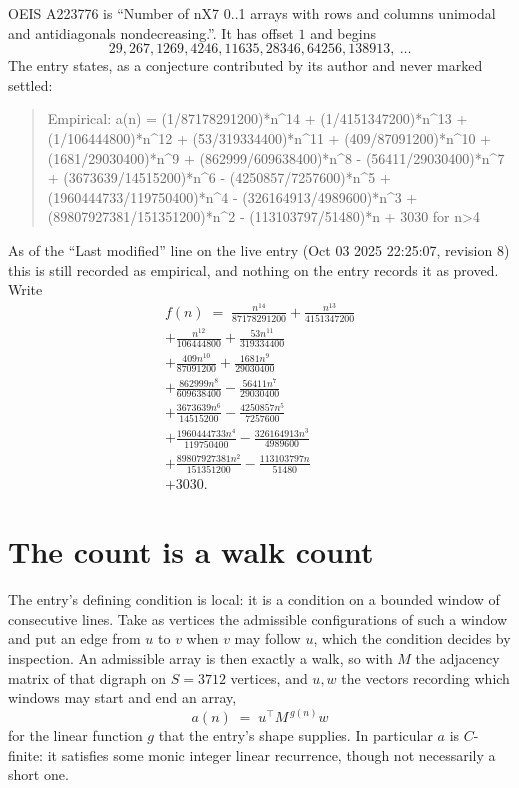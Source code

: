 \documentclass[11pt,a4paper]{article}
\theoremstyle{plain}
\theoremstyle{definition}
\begin{document}
OEIS A223776 is ``Number of nX7 0..1 arrays with rows and columns unimodal and antidiagonals nondecreasing.''. It has offset $1$ and begins
\[
29, 267, 1269, 4246, 11635, 28346, 64256, 138913,\ \dots
\]
The entry states, as a conjecture contributed by its author and never marked settled:
\begin{quote}\raggedright\small
Empirical: a(n) = (1/87178291200)*n\^{}14 + (1/4151347200)*n\^{}13 + (1/106444800)*n\^{}12 + (53/319334400)*n\^{}11 + (409/87091200)*n\^{}10 + (1681/29030400)*n\^{}9 + (862999/609638400)*n\^{}8 - (56411/29030400)*n\^{}7 + (3673639/14515200)*n\^{}6 - (4250857/7257600)*n\^{}5 + (1960444733/119750400)*n\^{}4 - (326164913/4989600)*n\^{}3 + (89807927381/151351200)*n\^{}2 - (113103797/51480)*n + 3030 for n>4
\end{quote}
As of the ``Last modified'' line on the live entry (Oct 03 2025 22:25:07, revision 8) this is still
recorded as empirical, and nothing on the entry records it as proved. Write
\begin{multline*}
f(n)\;=\;\frac{n^{14}}{87178291200} + \frac{n^{13}}{4151347200} \\
+ \frac{n^{12}}{106444800} + \frac{53 n^{11}}{319334400} \\
+ \frac{409 n^{10}}{87091200} + \frac{1681 n^{9}}{29030400} \\
+ \frac{862999 n^{8}}{609638400} - \frac{56411 n^{7}}{29030400} \\
+ \frac{3673639 n^{6}}{14515200} - \frac{4250857 n^{5}}{7257600} \\
+ \frac{1960444733 n^{4}}{119750400} - \frac{326164913 n^{3}}{4989600} \\
+ \frac{89807927381 n^{2}}{151351200} - \frac{113103797 n}{51480} \\
+ 3030.
\end{multline*}

\section{The count is a walk count}

The entry's defining condition is local: it is a condition on a bounded window of consecutive lines. Take as vertices the
admissible configurations of such a window and put an edge from $u$ to $v$ when $v$ may
follow $u$, which the condition decides by inspection. An admissible array is then exactly a
walk, so with $M$ the adjacency matrix of that digraph on $S=3712$ vertices, and $u,w$ the
vectors recording which windows may start and end an array,
\[
a(n)\;=\;u^{\!\top}M^{\,g(n)}w
\]
for the linear function $g$ that the entry's shape supplies. In particular $a$ is
$C$-finite: it satisfies some monic integer linear recurrence, though not necessarily a short
one.
\end{document}

